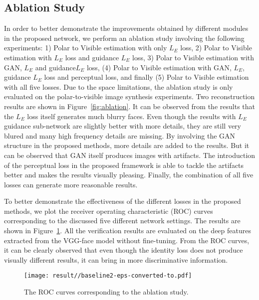\documentclass[10pt,twocolumn,letterpaper]{article}
\begin{document}
\subsection{Ablation Study} 
In order to better demonstrate the improvements obtained by different modules in the proposed network, we perform an ablation study involving the following experiments: 
1) Polar to Visible estimation with only $L_E$ loss, 2) Polar to Visible estimation with $L_E$ loss and guidance $L_E$ loss, 3) Polar to Visible estimation with GAN, $L_E$ and guidance$L_E$ loss, (4) Polar to Visible estimation with GAN, $L_E$, guidance $L_E$ loss and perceptual loss, and finally (5) Polar to Visible estimation with all five losses. Due to the space limitations, the ablation study is only evaluated on the polar-to-visible image synthesis experiments. Two reconstruction results are shown in Figure~\ref{fig:ablation}. It can be observed from the results that the $L_E$ loss itself generates much blurry faces. Even though the results with $L_E$ guidance sub-network are slightly better with more details, they are still very blured and many high frequency details are missing. By involving the GAN structure in the proposed methods, more details are added to the results.  But it can be observed that GAN itself produces images with artifacts.    The introduction of the perceptual loss in the proposed framework is able to tackle the artifacts better and makes the results visually pleasing. Finally, the combination of all five losses can generate more reasonable results. 

To better demonstrate the effectiveness of the different losses in the proposed methods, we plot the receiver operating characteristic (ROC) curves corresponding to the discussed five different network settings.   The results are shown in Figure~\ref{fig:base}. All the verification results are evaluated on the deep features extracted from the VGG-face model \cite{vggface} without fine-tuning.  From the ROC curves, it can be clearly observed that even though the identity loss does not produce visually different results, it can bring in more discriminative information.  

\begin{figure}[htp!]
\centering
\texttt{[image: result//baseline2-eps-converted-to.pdf]}
 \vskip -6pt  \caption{The ROC curves corresponding to the ablation study. }
\label{fig:base}
\end{figure}


 
\end{document}
